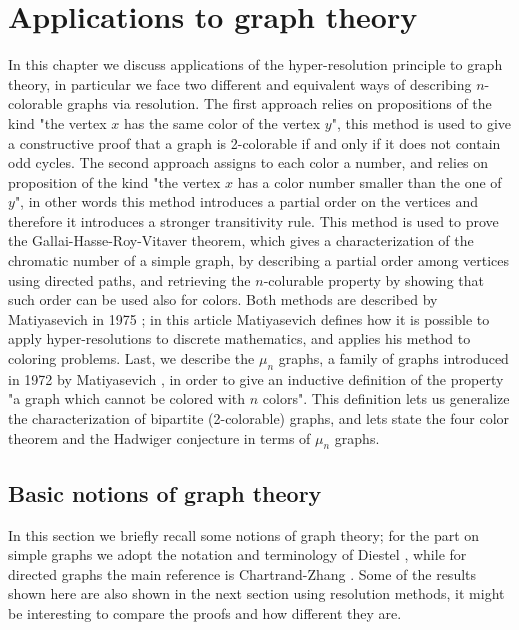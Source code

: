 \documentclass[a4paper,12pt,oneside]{book}
\begin{document}
\chapter{Applications to graph theory}%
In this chapter we discuss applications of the hyper-resolution principle to graph theory, in particular we  face two different and equivalent ways of describing $n$-colorable graphs via resolution. The first approach relies on propositions of the kind "the vertex $x$ has the same color of the vertex $y$", this method is used to give a constructive proof that a graph is 2-colorable if and only if it does not contain odd cycles. The second approach assigns to each color a number, and relies on proposition of the kind "the vertex $x$ has a color number smaller than the one of $y$", in other words this method introduces a partial order on the vertices and therefore it introduces a stronger transitivity rule. This method is used to prove the Gallai-Hasse-Roy-Vitaver theorem, which gives a characterization of the chromatic number of a simple graph, by describing a partial order among vertices using directed paths, and retrieving the $n$-colurable property by showing that such order can be used also for colors. 
Both methods are described by Matiyasevich in 1975 \cite{mat-1}; in this article Matiyasevich defines how it is possible to apply hyper-resolutions to discrete mathematics, and applies his method to coloring problems.
Last, we describe the $\mu_n$ graphs, a family of graphs introduced in 1972 by Matiyasevich \cite{mat-2}, in order to give an inductive definition of the property "a graph which cannot be colored with $n$ colors". This definition lets us generalize the characterization of bipartite (2-colorable) graphs, and lets state the four color theorem and the Hadwiger conjecture in terms of $\mu_n$ graphs.


\section{Basic notions of graph theory}

In this section we briefly recall some notions of graph theory; for the part on simple graphs we adopt the notation and terminology of Diestel \cite{diestel}, while for directed graphs the main reference is Chartrand-Zhang \cite{chrom}. Some of the results shown here are also shown in the next section using resolution methods, it might be interesting to compare the proofs and how different they are.
\end{document}
